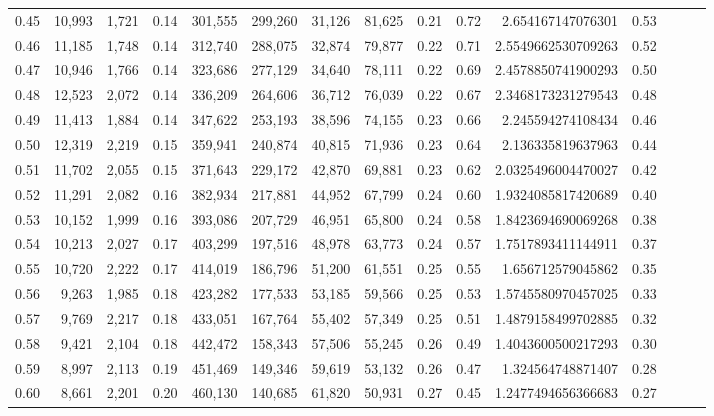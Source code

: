 \begin{tabular}{rrrrrrrrrrrrrrr}
0.45 &  10,993 &  1,721 &  0.14 &  301,555 &  299,260 &   31,126 &   81,625 &  0.21 &  0.72 &     2.654167147076301 &      0.53 \\
0.46 &  11,185 &  1,748 &  0.14 &  312,740 &  288,075 &   32,874 &   79,877 &  0.22 &  0.71 &    2.5549662530709263 &      0.52 \\
0.47 &  10,946 &  1,766 &  0.14 &  323,686 &  277,129 &   34,640 &   78,111 &  0.22 &  0.69 &    2.4578850741900293 &      0.50 \\
0.48 &  12,523 &  2,072 &  0.14 &  336,209 &  264,606 &   36,712 &   76,039 &  0.22 &  0.67 &    2.3468173231279543 &      0.48 \\
0.49 &  11,413 &  1,884 &  0.14 &  347,622 &  253,193 &   38,596 &   74,155 &  0.23 &  0.66 &     2.245594274108434 &      0.46 \\
0.50 &  12,319 &  2,219 &  0.15 &  359,941 &  240,874 &   40,815 &   71,936 &  0.23 &  0.64 &     2.136335819637963 &      0.44 \\
0.51 &  11,702 &  2,055 &  0.15 &  371,643 &  229,172 &   42,870 &   69,881 &  0.23 &  0.62 &    2.0325496004470027 &      0.42 \\
0.52 &  11,291 &  2,082 &  0.16 &  382,934 &  217,881 &   44,952 &   67,799 &  0.24 &  0.60 &    1.9324085817420689 &      0.40 \\
0.53 &  10,152 &  1,999 &  0.16 &  393,086 &  207,729 &   46,951 &   65,800 &  0.24 &  0.58 &    1.8423694690069268 &      0.38 \\
0.54 &  10,213 &  2,027 &  0.17 &  403,299 &  197,516 &   48,978 &   63,773 &  0.24 &  0.57 &    1.7517893411144911 &      0.37 \\
0.55 &  10,720 &  2,222 &  0.17 &  414,019 &  186,796 &   51,200 &   61,551 &  0.25 &  0.55 &     1.656712579045862 &      0.35 \\
0.56 &   9,263 &  1,985 &  0.18 &  423,282 &  177,533 &   53,185 &   59,566 &  0.25 &  0.53 &    1.5745580970457025 &      0.33 \\
0.57 &   9,769 &  2,217 &  0.18 &  433,051 &  167,764 &   55,402 &   57,349 &  0.25 &  0.51 &    1.4879158499702885 &      0.32 \\
0.58 &   9,421 &  2,104 &  0.18 &  442,472 &  158,343 &   57,506 &   55,245 &  0.26 &  0.49 &    1.4043600500217293 &      0.30 \\
0.59 &   8,997 &  2,113 &  0.19 &  451,469 &  149,346 &   59,619 &   53,132 &  0.26 &  0.47 &     1.324564748871407 &      0.28 \\
0.60 &   8,661 &  2,201 &  0.20 &  460,130 &  140,685 &   61,820 &   50,931 &  0.27 &  0.45 &    1.2477494656366683 &      0.27 \\

\end{tabular}
